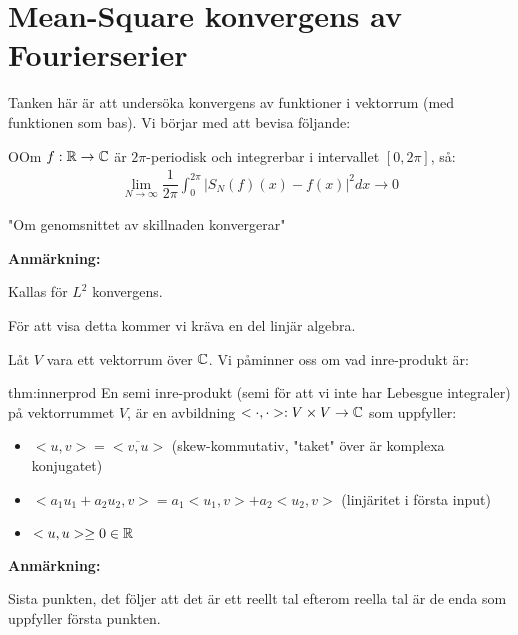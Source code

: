\section{Mean-Square konvergens av Fourierserier}\par
\noindent Tanken här är att undersöka konvergens av funktioner i vektorrum (med funktionen som bas). Vi börjar med att bevisa följande:
\par\bigskip
\begin{theo}
  OOm $f:\mathbb{R}\to\mathbb{C}$ är $2\pi$-periodisk och integrerbar i intervallet $[0,2\pi]$, så:
  \begin{equation*}
    \begin{gathered}
      \lim_{N\to\infty}\dfrac{1}{2\pi}\int_{0}^{2\pi}\left|S_N(f)(x)-f(x)\right|^2dx \to0
    \end{gathered}
  \end{equation*}\par
  \noindent "Om genomsnittet av skillnaden konvergerar"
\end{theo}
\par\bigskip
\noindent\textbf{Anmärkning:}\par
\noindent Kallas för $L^2$ konvergens.
\par\bigskip
\noindent För att visa detta kommer vi kräva en del linjär algebra.
\par\bigskip
\noindent Låt $V$ vara ett vektorrum över $\mathbb{C}$. Vi påminner oss om vad inre-produkt är:
\par\bigskip
\begin{theo}{thm:innerprod}
  En semi inre-produkt (semi för att vi inte har Lebesgue integraler) på vektorrummet $V$, är en avbildning $<\cdot,\cdot>:V\times V\to\mathbb{C}$ som uppfyller:\par
  \begin{itemize}
    \item $<u,v> = \overline{<v,u>}$ (skew-kommutativ, "taket" över är komplexa konjugatet)
    \item $<a_1u_1+a_2u_2,v> = a_1<u_1,v>+a_2<u_2,v>$ (linjäritet i första input)
    \item $<u,u>\geq0\in\mathbb{R}$
  \end{itemize}
\end{theo}
\par\bigskip
\noindent\textbf{Anmärkning:}\par
\noindent Sista punkten, det följer att det är ett reellt tal efterom reella tal är de enda som uppfyller första punkten.
\par\bigskip

